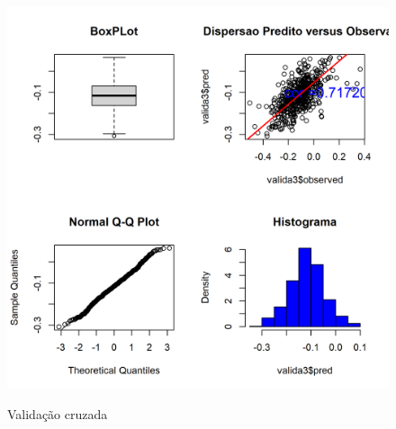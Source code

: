 			\begin{minipage}[t!]{0.31\textwidth}
				
				\begin{figure}[H]
					\centering \small \caption{Validação cruzada}
					\includegraphics[width=0.97\linewidth]{FIGURAS/valicas}
					\label{fig:xvalid.cruzadaesferica2}
				\end{figure}		
			\end{minipage} 
			
